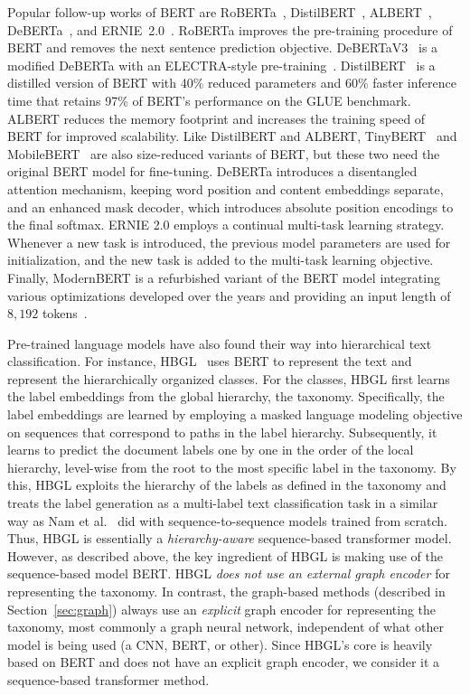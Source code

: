 \documentclass[acmsmall,nonacm]{acmart}
\begin{document}
Popular follow-up works of BERT are
RoBERTa~\cite{liu_roberta:_2019}, DistilBERT~\cite{distilbert}, ALBERT~\cite{lan_albert_2020}, DeBERTa~\cite{he_deberta_2021}, and
ERNIE~2.0~\cite{sun_ernie_2019}.
RoBERTa improves the pre-training procedure of BERT and removes the next sentence prediction objective.
DeBERTaV3~\cite{DBLP:conf/iclr/HeGC23} is a modified DeBERTa with an ELECTRA-style pre-training~\cite{DBLP:conf/iclr/ClarkLLM20-electra}.
DistilBERT~\cite{distilbert} is a distilled version of BERT with 40\% reduced parameters and 60\% faster inference time that retains 97\% of BERT's performance on the GLUE benchmark.
ALBERT reduces the memory footprint and increases the training speed of BERT for improved scalability.
Like DistilBERT and ALBERT, TinyBERT~\cite{tinybert} and MobileBERT~\cite{sun2020mobilebert} are also size-reduced variants of BERT, but these two need the original BERT model for fine-tuning.
DeBERTa introduces a disentangled attention mechanism, \ie keeping word position and content embeddings separate, and an enhanced mask decoder, which introduces absolute position encodings to the final softmax.
ERNIE 2.0 employs a continual multi-task learning strategy. 
Whenever a new task is introduced, the previous model parameters are used for initialization, and the new task is added to the multi-task learning objective.
Finally, ModernBERT is a refurbished variant of the BERT model integrating various optimizations developed over the years and providing an input length of $8,192$ tokens~\cite{warner2024smarterbetterfasterlonger}.

Pre-trained language models have also found their way into hierarchical text classification.
For instance, HBGL~\cite{hbgl} uses BERT to represent the text and represent the hierarchically organized classes.
For the classes, HBGL first learns the label embeddings from the global hierarchy, \ie the taxonomy.
Specifically, the label embeddings are learned by employing a masked language modeling objective on sequences that correspond to paths in the label hierarchy.
Subsequently, it learns to predict the document labels one by one in the order of the local hierarchy, \ie level-wise from the root to the most specific label in the taxonomy.
By this, HBGL exploits the hierarchy of the labels as defined in the taxonomy and treats the label generation as a multi-label text classification task in a similar way as Nam et al.~ \cite{namMaximizingSubsetAccuracy2017} did with sequence-to-sequence models trained from scratch.
Thus, HBGL is essentially a \textit{hierarchy-aware} sequence-based transformer model. 
However, as described above, the key ingredient of HBGL is making use of the sequence-based model BERT.
HBGL \textit{does not use an external graph encoder} for representing the taxonomy.
In contrast, the graph-based methods (described in Section~\ref{sec:graph}) always use an \textit{explicit} graph encoder for representing the taxonomy, most commonly a graph neural network, independent of what other model is being used (\eg a CNN, BERT, or other).
Since HBGL's core is heavily based on BERT and does not have an explicit graph encoder, we consider it a sequence-based transformer method.
\end{document}

